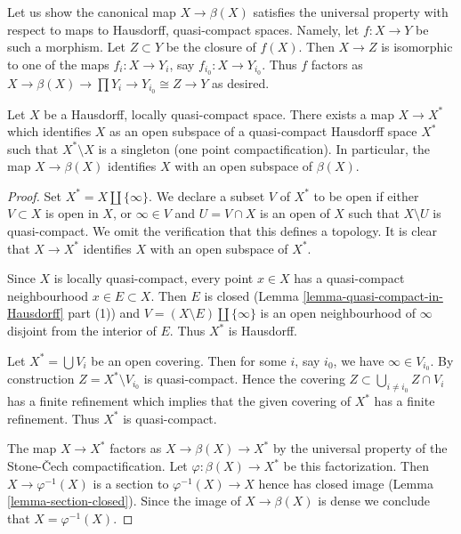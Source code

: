 \medskip\noindent
Let us show the canonical map $X \to \beta(X)$ satisfies the universal
property with respect to maps to Hausdorff, quasi-compact spaces. Namely,
let $f : X \to Y$ be such a morphism. Let $Z \subset Y$ be the closure
of $f(X)$. Then $X \to Z$ is isomorphic to one of the maps
$f_i : X \to Y_i$, say $f_{i_0} : X \to Y_{i_0}$. Thus $f$ factors as
$X \to \beta(X) \to \prod Y_i \to Y_{i_0} \cong Z \to Y$ as desired.

\begin{lemma}
\label{lemma-one-point-compactification}
Let $X$ be a Hausdorff, locally quasi-compact space.
There exists a map $X \to X^*$ which identifies $X$ as an open
subspace of a quasi-compact Hausdorff space $X^*$ such that
$X^* \setminus X$ is a singleton (one point compactification).
In particular, the map $X \to \beta(X)$ identifies $X$
with an open subspace of $\beta(X)$.
\end{lemma}

\begin{proof}
Set $X^* = X \amalg \{\infty\}$. We declare a subset $V$ of $X^*$ to be
open if either $V \subset X$ is open in $X$, or $\infty \in V$ and
$U = V \cap X$ is an open of $X$ such that $X \setminus U$ is quasi-compact.
We omit the verification that this defines a topology. It is clear
that $X \to X^*$ identifies $X$ with an open subspace of $X^*$.

\medskip\noindent
Since $X$ is locally quasi-compact, every point $x \in X$ has a
quasi-compact neighbourhood $x \in E \subset X$. Then $E$
is closed (Lemma \ref{lemma-quasi-compact-in-Hausdorff} part (1)) and
$V = (X \setminus E) \amalg \{\infty\}$ is an open neighbourhood
of $\infty$ disjoint from the interior of $E$. Thus $X^*$ is Hausdorff.

\medskip\noindent
Let $X^* = \bigcup V_i$ be an open covering. Then for some $i$, say $i_0$,
we have $\infty \in V_{i_0}$. By construction $Z = X^* \setminus V_{i_0}$
is quasi-compact. Hence the covering
$Z \subset \bigcup_{i \not = i_0} Z \cap V_i$ has a finite refinement which
implies that the given covering of $X^*$ has a finite refinement.
Thus $X^*$ is quasi-compact.

\medskip\noindent
The map $X \to X^*$ factors as $X \to \beta(X) \to X^*$ by the universal
property of the Stone-{\v C}ech compactification. Let
$\varphi : \beta(X) \to X^*$ be this factorization.
Then $X \to \varphi^{-1}(X)$ is a section to
$\varphi^{-1}(X) \to X$ hence has closed image
(Lemma \ref{lemma-section-closed}).
Since the image of $X \to \beta(X)$ is dense we conclude that
$X = \varphi^{-1}(X)$.
\end{proof}










